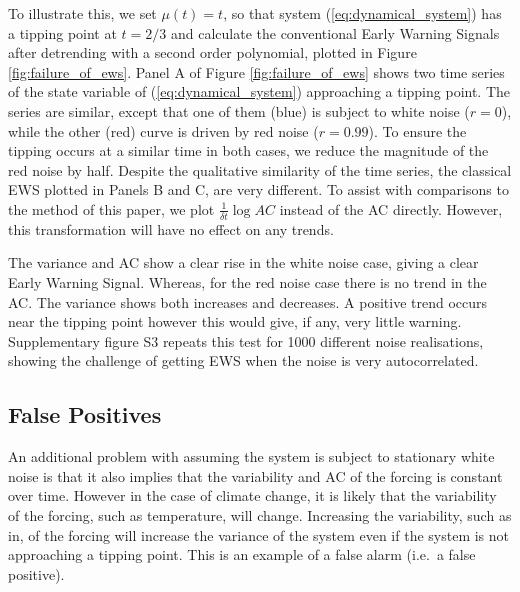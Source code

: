 To illustrate this, we set $\mu(t) = t$, so that system (\ref{eq:dynamical_system}) has
a tipping point at $t=2/3$ and calculate the conventional Early 
Warning Signals after detrending with a second order polynomial, plotted in Figure \ref{fig:failure_of_ews}.
Panel A of Figure \ref{fig:failure_of_ews} shows two time series of the 
state variable of (\ref{eq:dynamical_system}) approaching a tipping point.
The series are similar, except that one of them (blue) is subject to white noise ($r = 0$), 
while the other (red) curve is driven by red noise ($r = 0.99$). To
ensure the tipping occurs at a similar time in both
cases, we reduce the magnitude of the red noise by half.
Despite the qualitative similarity of the time series,
the classical EWS plotted in Panels B and C, are very different. To assist with comparisons to the method of this paper, we
plot $\frac{1}{\delta t}\log AC$ instead of the AC directly. However, this
transformation will have no effect on any trends.

The variance and AC show a clear rise in
the white noise case, giving a clear Early Warning Signal. 
Whereas, for the red noise case there is no trend in the AC. The 
variance shows both increases and decreases. A positive trend occurs near
the tipping point however this would give, if any, very little warning. Supplementary figure
S3 repeats this test for 1000 different noise realisations, showing the
challenge of getting EWS when the noise is very 
autocorrelated.


\subsection{False Positives}
An additional problem with assuming the system is subject to stationary white noise is that it also implies that the
variability and AC of the forcing is constant over time. 
However in the case of 
climate change, it is likely that the variability of the forcing,
such as temperature, will change\cite{Huntingford2013}. 
Increasing the variability, such as in\cite{Boers2021a}, of the forcing will increase the variance of the system even
if the system is not approaching a tipping point. This is an example of a false
alarm (i.e.\ a false positive). 

